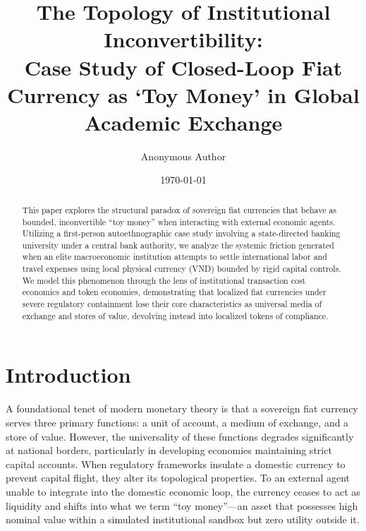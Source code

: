 \documentclass[reprint,amsmath,amssymb,aps,prd,showkeys]{revtex4-2}
\begin{document}

\title{The Topology of Institutional Inconvertibility: \\ Case Study of Closed-Loop Fiat Currency as `Toy Money' in Global Academic Exchange}

\author{Anonymous Author}

\date{\today}

\begin{abstract}
This paper explores the structural paradox of sovereign fiat currencies that behave as bounded, inconvertible ``toy money'' when interacting with external economic agents. Utilizing a first-person autoethnographic case study involving a state-directed banking university under a central bank authority, we analyze the systemic friction generated when an elite macroeconomic institution attempts to settle international labor and travel expenses using local physical currency (VND) bounded by rigid capital controls. We model this phenomenon through the lens of institutional transaction cost economics and token economies, demonstrating that localized fiat currencies under severe regulatory containment lose their core characteristics as universal media of exchange and stores of value, devolving instead into localized tokens of compliance.
\end{abstract}


\maketitle

\section{Introduction}
A foundational tenet of modern monetary theory is that a sovereign fiat currency serves three primary functions: a unit of account, a medium of exchange, and a store of value. However, the universality of these functions degrades significantly at national borders, particularly in developing economies maintaining strict capital accounts. When regulatory frameworks insulate a domestic currency to prevent capital flight, they alter its topological properties. To an external agent unable to integrate into the domestic economic loop, the currency ceases to act as liquidity and shifts into what we term ``toy money''---an asset that possesses high nominal value within a simulated institutional sandbox but zero utility outside it.
\end{document}
